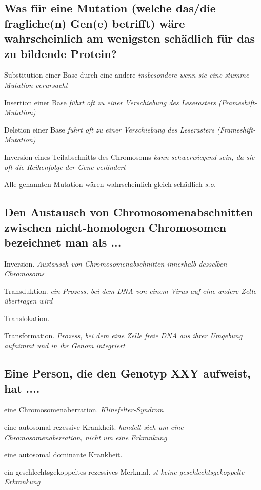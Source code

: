 \documentclass{article}
\newcommand{\cmark}{\ding{51}}%
\newcommand{\done}{\rlap{$\square$}{\raisebox{2pt}{\large\hspace{1pt}\cmark}}%
\hspace{-2.5pt}}
\begin{document}
\subsection*{Was für eine Mutation (welche das/die fragliche(n) Gen(e) betrifft) wäre
wahrscheinlich am wenigsten schädlich für das zu bildende Protein?}
\begin{todolist}%
\item[\done] Substitution einer Base durch eine andere  \textit{\scriptsize insbesondere wenn sie eine stumme Mutation verursacht}
\item Insertion einer Base \textit{\scriptsize führt oft zu einer Verschiebung des Leserasters (Frameshift-Mutation)}
\item Deletion einer Base \textit{\scriptsize führt oft zu einer Verschiebung des Leserasters (Frameshift-Mutation)}
\item Inversion eines Teilabschnitts des Chromosoms \textit{\scriptsize kann schwerwiegend sein, da sie oft die Reihenfolge der Gene verändert}
\item Alle genannten Mutation wären wahrscheinlich gleich schädlich \textit{\scriptsize s.o.}
\end{todolist}

\subsection*{Den Austausch von Chromosomenabschnitten zwischen nicht-homologen
Chromosomen bezeichnet man als ...}
\begin{todolist}%
\item Inversion. \textit{\scriptsize Austausch von Chromosomenabschnitten innerhalb desselben Chromosoms}
\item Transduktion. \textit{\scriptsize ein Prozess, bei dem DNA von einem Virus auf eine andere Zelle übertragen wird}
\item[\done] Translokation. 
\item Transformation. \textit{\scriptsize Prozess, bei dem eine Zelle freie DNA aus ihrer Umgebung aufnimmt und in ihr Genom integriert}
\end{todolist}

\subsection*{Eine Person, die den Genotyp XXY aufweist, hat ....}
\begin{todolist}%
\item[\done] eine Chromosomenaberration. \textit{\scriptsize Klinefelter-Syndrom}
\item eine autosomal rezessive Krankheit.  \textit{\scriptsize handelt sich um eine Chromosomenaberration, nicht um eine Erkrankung}
\item eine autosomal dominante Krankheit. \textit{\scriptsize }
\item ein geschlechtsgekoppeltes rezessives Merkmal. \textit{\scriptsize st keine geschlechtsgekoppelte Erkrankung}
\end{todolist} 
\end{document}
